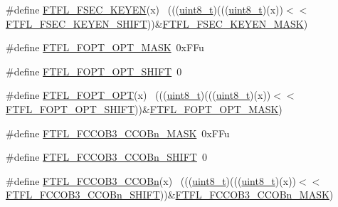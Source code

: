 \begin{DoxyCompactItemize}
\item 
\#define \hyperlink{group___f_t_f_l___register___masks_ga902d25c9bd51f43ed3c845bed8c1ebf6}{F\+T\+F\+L\+\_\+\+F\+S\+E\+C\+\_\+\+K\+E\+Y\+EN}(x)                                          ~(((\hyperlink{_p_e___types_8h_aba7bc1797add20fe3efdf37ced1182c5}{uint8\+\_\+t})(((\hyperlink{_p_e___types_8h_aba7bc1797add20fe3efdf37ced1182c5}{uint8\+\_\+t})(x))$<$$<$\hyperlink{group___f_t_f_l___register___masks_ga78a40af3a63448325e92624831cfa97b}{F\+T\+F\+L\+\_\+\+F\+S\+E\+C\+\_\+\+K\+E\+Y\+E\+N\+\_\+\+S\+H\+I\+FT}))\&\hyperlink{group___f_t_f_l___register___masks_gab98903ddeed66e96877b9fa7cd2db5b7}{F\+T\+F\+L\+\_\+\+F\+S\+E\+C\+\_\+\+K\+E\+Y\+E\+N\+\_\+\+M\+A\+SK})
\item 
\#define \hyperlink{group___f_t_f_l___register___masks_ga680d0e8b99b5bc4b2f8c88141ea38542}{F\+T\+F\+L\+\_\+\+F\+O\+P\+T\+\_\+\+O\+P\+T\+\_\+\+M\+A\+SK}~0x\+F\+Fu
\item 
\#define \hyperlink{group___f_t_f_l___register___masks_gaf9bb9e944f624d01fbeef30f7b164a0b}{F\+T\+F\+L\+\_\+\+F\+O\+P\+T\+\_\+\+O\+P\+T\+\_\+\+S\+H\+I\+FT}~0
\item 
\#define \hyperlink{group___f_t_f_l___register___masks_ga4af1975ba289c7910bc8b5182daaf750}{F\+T\+F\+L\+\_\+\+F\+O\+P\+T\+\_\+\+O\+PT}(x)                                              ~(((\hyperlink{_p_e___types_8h_aba7bc1797add20fe3efdf37ced1182c5}{uint8\+\_\+t})(((\hyperlink{_p_e___types_8h_aba7bc1797add20fe3efdf37ced1182c5}{uint8\+\_\+t})(x))$<$$<$\hyperlink{group___f_t_f_l___register___masks_gaf9bb9e944f624d01fbeef30f7b164a0b}{F\+T\+F\+L\+\_\+\+F\+O\+P\+T\+\_\+\+O\+P\+T\+\_\+\+S\+H\+I\+FT}))\&\hyperlink{group___f_t_f_l___register___masks_ga680d0e8b99b5bc4b2f8c88141ea38542}{F\+T\+F\+L\+\_\+\+F\+O\+P\+T\+\_\+\+O\+P\+T\+\_\+\+M\+A\+SK})
\item 
\#define \hyperlink{group___f_t_f_l___register___masks_gacff4adeaedde61f2512f172b251e9b65}{F\+T\+F\+L\+\_\+\+F\+C\+C\+O\+B3\+\_\+\+C\+C\+O\+Bn\+\_\+\+M\+A\+SK}~0x\+F\+Fu
\item 
\#define \hyperlink{group___f_t_f_l___register___masks_ga2e92f6724d8bd90661bf049fec1d6aef}{F\+T\+F\+L\+\_\+\+F\+C\+C\+O\+B3\+\_\+\+C\+C\+O\+Bn\+\_\+\+S\+H\+I\+FT}~0
\item 
\#define \hyperlink{group___f_t_f_l___register___masks_ga2b503163ecce1fbdf00bb31fc4747bf0}{F\+T\+F\+L\+\_\+\+F\+C\+C\+O\+B3\+\_\+\+C\+C\+O\+Bn}(x)                                      ~(((\hyperlink{_p_e___types_8h_aba7bc1797add20fe3efdf37ced1182c5}{uint8\+\_\+t})(((\hyperlink{_p_e___types_8h_aba7bc1797add20fe3efdf37ced1182c5}{uint8\+\_\+t})(x))$<$$<$\hyperlink{group___f_t_f_l___register___masks_ga2e92f6724d8bd90661bf049fec1d6aef}{F\+T\+F\+L\+\_\+\+F\+C\+C\+O\+B3\+\_\+\+C\+C\+O\+Bn\+\_\+\+S\+H\+I\+FT}))\&\hyperlink{group___f_t_f_l___register___masks_gacff4adeaedde61f2512f172b251e9b65}{F\+T\+F\+L\+\_\+\+F\+C\+C\+O\+B3\+\_\+\+C\+C\+O\+Bn\+\_\+\+M\+A\+SK})
$$
\end{DoxyCompactItemize}
